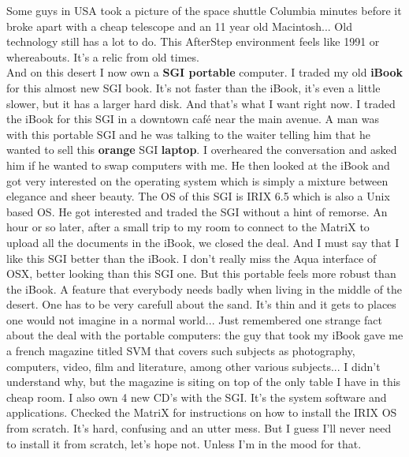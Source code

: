 \documentclass[11pt,twoside,a4paper]{book}
\begin{document}
\begin{multicols*}{2}
Some guys in USA took a picture of the space shuttle Columbia minutes before it broke apart with a cheap telescope and an 11 year old Macintosh... Old technology still has a lot to do. This AfterStep environment feels like 1991 or whereabouts. It's a relic from old times. ~\\

And on this desert I now own a \textbf{SGI portable} computer. I traded my old \textbf{iBook} for this almost new SGI book. It's not faster than the iBook, it's even a little slower, but it has a larger hard disk. And that's what I want right now. I traded the iBook for this SGI in a downtown caf{\'e} near the main avenue. A man was with this portable SGI and he was talking to the waiter telling him that he wanted to sell this \textbf{orange} SGI \textbf{laptop}. I overheared the conversation and asked him if he wanted to swap computers with me. He then looked at the iBook and got very interested on the operating system which is simply a mixture between elegance and sheer beauty. The OS of this SGI is IRIX 6.5 which is also a Unix based OS. He got interested and traded the SGI without a hint of remorse. An hour or so later, after a small trip to my room to connect to the MatriX to upload all the documents in the iBook, we closed the deal. And I must say that I like this SGI better than the iBook. I don't really miss the Aqua interface of OSX, better looking than this SGI one. But this portable feels more robust than the iBook. A feature that everybody needs badly when living in the middle of the desert. One has to be very carefull about the sand. It's thin and it gets to places one would not imagine in a normal world... Just remembered one strange fact about the deal with the portable computers: the guy that took my iBook gave me a french magazine titled SVM that covers such subjects as photography, computers, video, film and literature, among other various subjects... I didn't understand why, but the magazine is siting on top of the only table I have in this cheap room. I also own 4 new CD's with the SGI. It's the system software and applications. Checked the MatriX for instructions on how to install the IRIX OS from scratch. It's hard, confusing and an utter mess. But I guess I'll never need to install it from scratch, let's hope not. Unless I'm in the mood for that. ~\\



\end{multicols*}
\end{document}
